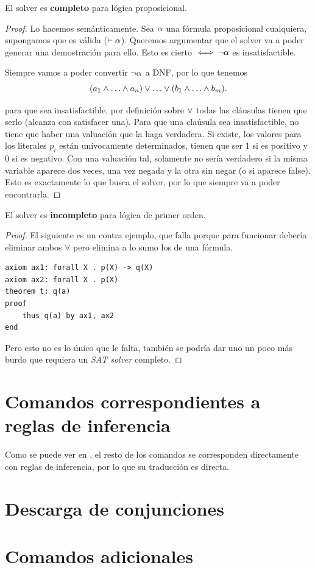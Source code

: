 \begin{theorem}
    El solver es \textbf{completo} para lógica proposicional.
\end{theorem}
\begin{proof}
Lo hacemos semánticamente. Sea $\alpha$ una fórmula proposicional cualquiera, supongamos que es válida ($\vdash \alpha$). Queremos argumentar que el solver va a poder generar una demostración para ello. Esto es cierto $\iff \neg \alpha$ es insatisfactible.

Siempre vamos a poder convertir $\neg \alpha$ a DNF, por lo que tenemos
\[
    (\formLit_1 \fAnd \dots \fAnd \formLit_n)
    \fOr \dots \fOr
    (\formLitTwo_1 \fAnd \dots \fAnd \formLitTwo_m).
\]

para que sea insatisfactible, por definición sobre $\vee$ todas las
cláusulas tienen que serlo (alcanza con satisfacer una). Para que una claúsula
sea insatisfactible, no tiene que haber una valuación que la haga verdadera. Si
existe, los valores para los literales $p_i$ están unívocamente determinados,
tienen que ser 1 si es positivo y 0 si es negativo. Con una valuación tal,
solamente no sería verdadero si la misma variable aparece dos veces, una vez
negada y la otra sin negar (o si aparece false). Esto es exactamente lo que busca el solver, por lo que siempre va a poder encontrarla.
\end{proof}

\begin{theorem}
    El solver es \textbf{incompleto} para lógica de primer orden.
\end{theorem}
\begin{proof}
El siguiente es un contra ejemplo, que falla porque para funcionar debería eliminar ambos $\forall$ pero elimina a lo sumo los de una fórmula.
\begin{lstlisting}
axiom ax1: forall X . p(X) -> q(X)
axiom ax2: forall X . p(X)
theorem t: q(a)
proof
    thus q(a) by ax1, ax2
end
\end{lstlisting}

Pero esto no es lo único que le falta, también se podría dar uno un poco más burdo que requiera un \textit{SAT solver} completo.
\end{proof}

\section{Comandos correspondientes a reglas de inferencia}

Como se puede ver en , el resto de los comandos se corresponden directamente con reglas de inferencia,
por lo que su traducción es directa.


\section{Descarga de conjunciones}

\section{Comandos adicionales}



